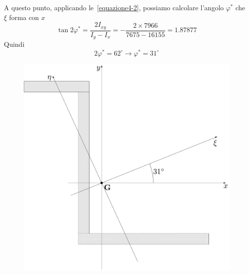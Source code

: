 A questo punto, applicando le~\eqref{equazione4-2}, possiamo calcolare l'angolo $\varphi^{*}$ che $\xi$ forma con $x$
\begin{equation*}
\tan 2\varphi^{*} = \frac{2I_{xy}}{I_{y}-I_{x}} = -\frac{2\times 7966}{7675-16155} = 1.87877
\end{equation*}
Quindi
\begin{equation*}
2\varphi^{*} = 62^{\circ} \longrightarrow \varphi^{*} = 31^{\circ}
\end{equation*}
\renewcommand{\thefigure}{4.1~-~3}
\begin{figure}[ht]
\centering
\includegraphics[width=\textwidth]{Immagini/Parte_4/Esercizio4_1/Esercizio4_1_3.pdf}
\caption{}
\label{Esercizio4-1-3}
\end{figure}
